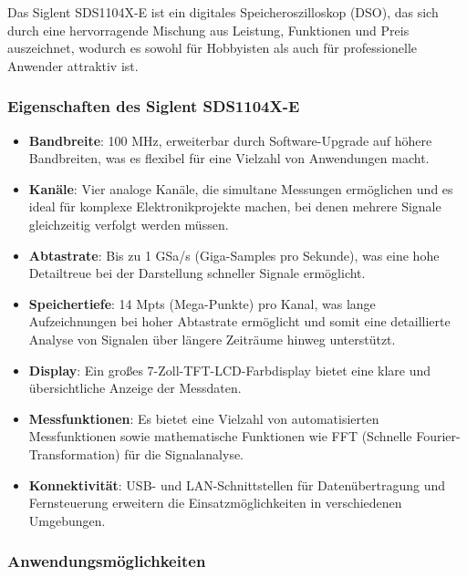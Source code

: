 \documentclass{vorlage-design-main}
\begin{document}
Das Siglent SDS1104X-E ist ein digitales Speicheroszilloskop (DSO), das
sich durch eine hervorragende Mischung aus Leistung, Funktionen und
Preis auszeichnet, wodurch es sowohl für Hobbyisten als auch für
professionelle Anwender attraktiv ist.

\hypertarget{eigenschaften-des-siglent-sds1104x-e}{%
\subsubsection{Eigenschaften des Siglent
SDS1104X-E}\label{eigenschaften-des-siglent-sds1104x-e}}

\begin{itemize}

\item
  \textbf{Bandbreite}: 100 MHz, erweiterbar durch Software-Upgrade auf
  höhere Bandbreiten, was es flexibel für eine Vielzahl von Anwendungen
  macht.
\item
  \textbf{Kanäle}: Vier analoge Kanäle, die simultane Messungen
  ermöglichen und es ideal für komplexe Elektronikprojekte machen, bei
  denen mehrere Signale gleichzeitig verfolgt werden müssen.
\item
  \textbf{Abtastrate}: Bis zu 1 GSa/s (Giga-Samples pro Sekunde), was
  eine hohe Detailtreue bei der Darstellung schneller Signale
  ermöglicht.
\item
  \textbf{Speichertiefe}: 14 Mpts (Mega-Punkte) pro Kanal, was lange
  Aufzeichnungen bei hoher Abtastrate ermöglicht und somit eine
  detaillierte Analyse von Signalen über längere Zeiträume hinweg
  unterstützt.
\item
  \textbf{Display}: Ein großes 7-Zoll-TFT-LCD-Farbdisplay bietet eine
  klare und übersichtliche Anzeige der Messdaten.
\item
  \textbf{Messfunktionen}: Es bietet eine Vielzahl von automatisierten
  Messfunktionen sowie mathematische Funktionen wie FFT (Schnelle
  Fourier-Transformation) für die Signalanalyse.
\item
  \textbf{Konnektivität}: USB- und LAN-Schnittstellen für
  Datenübertragung und Fernsteuerung erweitern die Einsatzmöglichkeiten
  in verschiedenen Umgebungen.
\end{itemize}

\hypertarget{anwendungsmuxf6glichkeiten}{%
\subsubsection{Anwendungsmöglichkeiten}\label{anwendungsmoeglichkeiten}}
\end{document}
